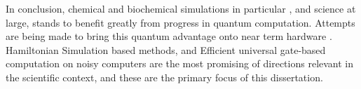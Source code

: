 In conclusion, chemical and biochemical simulations in particular \cite{guzik-quantum-chemistry-on-quantum-computer,guzik-quantum-chemistry-in-quantum-computing}, and science at large, stands to benefit greatly from progress in quantum computation. Attempts are being made to bring this quantum advantage onto near term hardware \cite{qsim-variational-algorithm}. Hamiltonian Simulation based methods, and Efficient universal gate-based computation on noisy computers are the most promising of directions relevant in the scientific context, and these are the primary focus of this dissertation.
